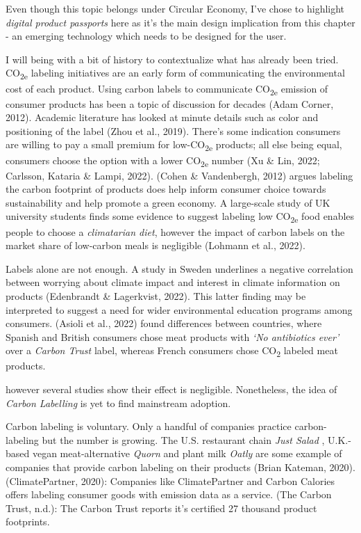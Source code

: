 \documentclass[
  letterpaper,
  DIV=11,
  numbers=noendperiod]{scrartcl}
\begin{document}
Even though this topic belongs under Circular Economy, I've chose to
highlight \emph{digital product passports} here as it's the main design
implication from this chapter - an emerging technology which needs to be
designed for the user.

I will being with a bit of history to contextualize what has already
been tried. CO\textsubscript{2e} labeling initiatives are an early form
of communicating the environmental cost of each product. Using carbon
labels to communicate CO\textsubscript{2e} emission of consumer products
has been a topic of discussion for decades (Adam Corner, 2012). Academic
literature has looked at minute details such as color and positioning of
the label (Zhou et al., 2019). There's some indication consumers are
willing to pay a small premium for low-CO\textsubscript{2e} products;
all else being equal, consumers choose the option with a lower
CO\textsubscript{2e} number (Xu \& Lin, 2022; Carlsson, Kataria \&
Lampi, 2022). (Cohen \& Vandenbergh, 2012) argues labeling the carbon
footprint of products does help inform consumer choice towards
sustainability and help promote a green economy. A large-scale study of
UK university students finds some evidence to suggest labeling low
CO\textsubscript{2e} food enables people to choose a \emph{climatarian
diet}, however the impact of carbon labels on the market share of
low-carbon meals is negligible (Lohmann et al., 2022).

Labels alone are not enough. A study in Sweden underlines a negative
correlation between worrying about climate impact and interest in
climate information on products (Edenbrandt \& Lagerkvist, 2022). This
latter finding may be interpreted to suggest a need for wider
environmental education programs among consumers. (Asioli et al., 2022)
found differences between countries, where Spanish and British consumers
chose meat products with \emph{`No antibiotics ever'} over a
\emph{Carbon Trust} label, whereas French consumers chose
CO\textsubscript{2} labeled meat products.

however several studies show their effect is negligible. Nonetheless,
the idea of \emph{Carbon Labelling} is yet to find mainstream adoption.

Carbon labeling is voluntary. Only a handful of companies practice
carbon-labeling but the number is growing. The U.S. restaurant chain
\emph{Just Salad} , U.K.-based vegan meat-alternative \emph{Quorn} and
plant milk \emph{Oatly} are some example of companies that provide
carbon labeling on their products (Brian Kateman, 2020).
(ClimatePartner, 2020): Companies like ClimatePartner and Carbon
Calories offers labeling consumer goods with emission data as a service.
(The Carbon Trust, n.d.): The Carbon Trust reports it's certified 27
thousand product footprints.
\end{document}
